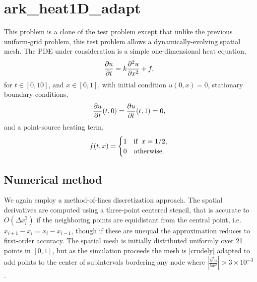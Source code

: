 \documentclass[letterpaper,10pt,english]{sphinxmanual}
\begin{document}
\chapter{ark\_heat1D\_adapt}
\label{ark_heat1D_adapt:id1}\label{ark_heat1D_adapt::doc}\label{ark_heat1D_adapt:ark-heat1d-adapt}
This problem is a clone of the  test problem except that
unlike the previous uniform-grid problem, this test problem allows a
dynamically-evolving spatial mesh.  The PDE under consideration is a
simple one-dimensional heat equation,
\begin{gather}
\begin{split}\frac{\partial u}{\partial t} = k \frac{\partial^2 u}{\partial x^2} + f,\end{split}\notag
\end{gather}
for $t \in [0, 10]$, and $x \in [0, 1]$, with initial
condition $u(0,x) = 0$, stationary boundary conditions,
\begin{gather}
\begin{split}\frac{\partial u}{\partial t}(t,0) = \frac{\partial u}{\partial t}(t,1) = 0,\end{split}\notag
\end{gather}
and a point-source heating term,
\begin{gather}
\begin{split}f(t,x) = \begin{cases} 1 & \text{if}\;\; x=1/2, \\
                       0 & \text{otherwise}. \end{cases}\end{split}\notag
\end{gather}

\section{Numerical method}
\label{ark_heat1D_adapt:numerical-method}
We again employ a method-of-lines discretization approach.  The
spatial derivatives are computed using a three-point centered stencil,
that is accurate to $O(\Delta x_i^2)$ if the neighboring points are
equidistant from the central point, i.e. $x_{i+1} - x_i = x_i -
x_{i-1}$, though if these are unequal the approximation reduces to
first-order accuracy.  The spatial mesh is initially distributed
uniformly over 21 points in $[0,1]$, but as the simulation
proceeds the mesh is {[}crudely{]} adapted to add points to the center of
subintervals bordering any node where
$\left|\frac{\partial^2 u}{\partial x^2}\right| > 3\times10^{-3}$.
\end{document}
